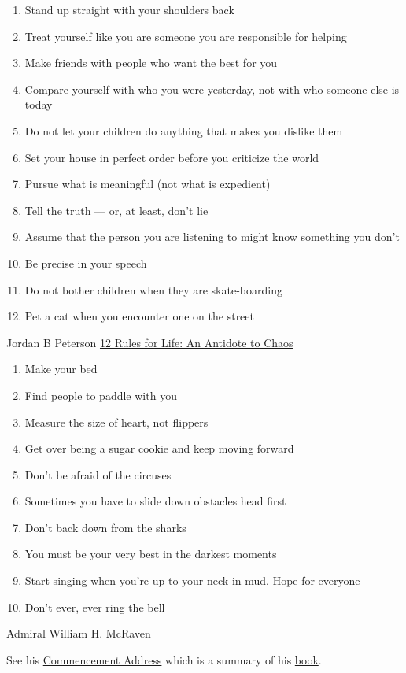 \documentclass{article}
\begin{document}
\begin{minipage}[t]{0.45\textwidth}

\begin{enumerate}
    \item Stand up straight with your shoulders back
    \item Treat yourself like you are someone you are responsible for helping
    \item Make friends with people who want the best for you
    \item Compare yourself with who you were yesterday, not with who someone else is today
    \item Do not let your children do anything that makes you dislike them
    \item Set your house in perfect order before you criticize the world
    \item Pursue what is meaningful (not what is expedient)
    \item Tell the truth — or, at least, don’t lie
    \item Assume that the person you are listening to might know something you don’t
    \item Be precise in your speech
    \item Do not bother children when they are skate-boarding
    \item Pet a cat when you encounter one on the street
\end{enumerate}
Jordan B Peterson
\href{https://www.goodreads.com/book/show/30257963-12-rules-for-life}{12 Rules for Life: An Antidote to Chaos}

\end{minipage}
\hfill
\begin{minipage}[t]{0.45\textwidth}

\begin{enumerate}
    \item Make your bed
    \item Find people to paddle with you
    \item Measure the size of heart, not flippers
    \item Get over being a sugar cookie and keep moving forward
    \item Don't be afraid of the circuses
    \item Sometimes you have to slide down obstacles head first
    \item Don't back down from the sharks
    \item You must be your very best in the darkest moments
    \item Start singing when you're up to your neck in mud.  Hope for everyone
    \item Don't ever, ever ring the bell
\end{enumerate}
Admiral William H. McRaven

See his \href{https://www.youtube.com/watch?v=pxBQLFLei70}{Commencement Address} which is a summary of his \href{https://www.goodreads.com/book/show/31423133-make-your-bed}{book}.

\end{minipage}
\end{document}
